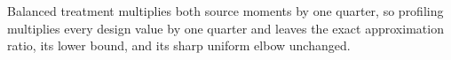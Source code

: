Balanced treatment multiplies both source moments by one quarter, so profiling multiplies every design value by one quarter and leaves the exact approximation ratio, its lower bound, and its sharp uniform elbow unchanged.